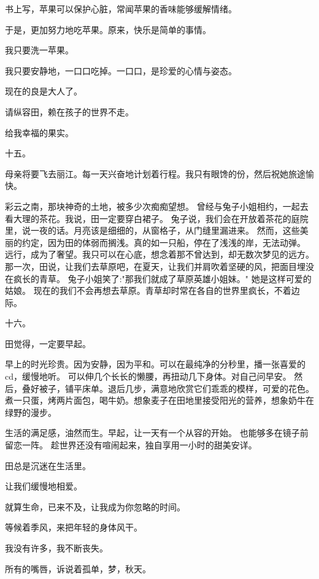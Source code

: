 \documentclass[12pt,a4paper]{article}
\def\blankrev{\vspace{1ex}}									%
\newcommand{\subpart}[1]{
	\begingroup \par
	\vspace{1ex} \centering #1
	\par \endgroup \nopagebreak[4]
}
\begin{document}
		\blankrev
		书上写，苹果可以保护心脏，常闻苹果的香味能够缓解情绪。\par
		于是，更加努力地吃苹果。原来，快乐是简单的事情。\par
		我只要洗一苹果。\par
		我只要安静地，一口口吃掉。一口口，是珍爱的心情与姿态。

		\blankrev
		现在的良是大人了。\par
		请纵容田，赖在孩子的世界不走。\par
		给我幸福的果实。


		\subpart{十五。}

		母亲将要飞去丽江。每一天兴奋地计划着行程。我只有眼馋的份，然后祝她旅途愉快。

		\blankrev
		彩云之南，那块神奇的土地，被多少次痴痴望想。
		曾经与兔子小姐相约，一起去看大理的茶花。我说，田一定要穿白裙子。
		兔子说，我们会在开放着茶花的庭院里，说一夜的话。月亮该是细细的，从窗格子，从门缝里漏进来。
		然而，这些美丽的约定，因为田的体弱而搁浅。真的如一只船，停在了浅浅的岸，无法动弹。
		远行，成为了奢望。我只可以在心底，想念着那不曾达到，却无数次梦见的远方。
		那一次，田说，让我们去草原吧，在夏天，让我们并肩吹着坚硬的风，把面目埋没在疯长的青草。
		兔子小姐笑了:"那我们就成了草原英雄小姐妹。"
		她是这样可爱的姑娘。
		现在的我们不会再想去草原。青草却时常在各自的世界里疯长，不着边际。


		\subpart{十六。}

		田觉得，一定要早起。

		\blankrev
		早上的时光珍贵。因为安静，因为平和。可以在最纯净的分秒里，播一张喜爱的cd，缓慢地听。
		可以伸几个长长的懒腰，再扭动几下身体。对自己问早安。
		然后，叠好被子，铺平床单。退后几步，满意地欣赏它们乖乖的模样，可爱的花色。
		煮一只蛋，烤两片面包，喝牛奶。想象麦子在田地里接受阳光的营养，想象奶牛在绿野的漫步。

		\blankrev
		生活的满足感，油然而生。早起，让一天有一个从容的开始。
		也能够多在镜子前留恋一阵。
		趁世界还没有喧闹起来，独自享用一小时的甜美安详。

		\blankrev
		田总是沉迷在生活里。

	\endwriting



		让我们缓慢地相爱。

		就算生命，已来不及，让我成为你忽略的时间。

		等候着季风，来把年轻的身体风干。

		我没有许多，我不断丧失。

		所有的嘴唇，诉说着孤单，梦，秋天。
\end{document}
